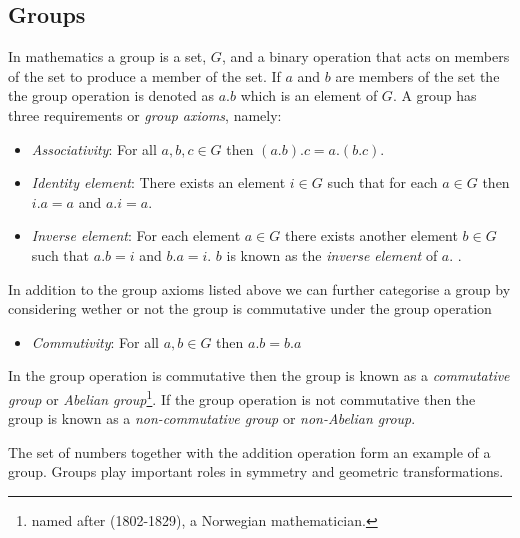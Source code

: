 \subsection{Groups}
\label{subsec:MathsAlgebraGroups}

In mathematics a group is a set, $G$, and a binary operation that acts
on members of the set to produce a member of the set. If $a$ and $b$
are members of the set the the group operation is denoted as $a.b$
which is an element of $G$. A group has three requirements or
\emph{group axioms}, namely:
\begin{itemize}
\item \emph{Associativity}: For all $a,b,c\in G$ then $(a.b).c = a.(b.c)$.
\item \emph{Identity element}: There exists an element $i\in G$ such that for each $a\in G$ then $i.a=a$ and $a.i=a$.
\item \emph{Inverse element}: For each element $a\in G$ there exists another element $b\in G$ such that $a.b=i$ and $b.a=i$. $b$ is known as the \emph{inverse element} of $a$. .
\end{itemize}

In addition to the group axioms listed above we can further categorise
a group by considering wether or not the group is commutative under
the group operation \ie
\begin{itemize}
  \item \emph{Commutivity}: For all $a,b\in G$ then $a.b=b.a$
\end{itemize}

In the group operation is commutative then the group is known as a
\emph{commutative group} or \emph{Abelian group}\footnote{named after
 (1802-1829), a Norwegian mathematician.}. If the group
operation is not commutative then the group is known as a
\emph{non-commutative group} or \emph{non-Abelian group}.

The set of numbers together with the addition operation form an
example of a group. Groups play important roles in symmetry and
geometric transformations.

